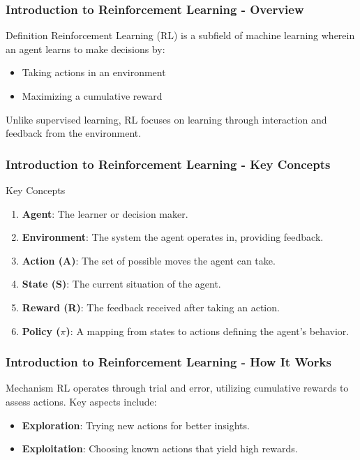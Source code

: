 \documentclass[aspectratio=169]{beamer}
\begin{document}
\frame{\titlepage}

\begin{frame}[fragile]
    \frametitle{Introduction to Reinforcement Learning - Overview}
    \begin{block}{Definition}
        Reinforcement Learning (RL) is a subfield of machine learning wherein an agent learns to make decisions by:
        \begin{itemize}
            \item Taking actions in an environment
            \item Maximizing a cumulative reward
        \end{itemize}
        Unlike supervised learning, RL focuses on learning through interaction and feedback from the environment.
    \end{block}
\end{frame}

\begin{frame}[fragile]
    \frametitle{Introduction to Reinforcement Learning - Key Concepts}
    \begin{block}{Key Concepts}
        \begin{enumerate}
            \item \textbf{Agent}: The learner or decision maker.
            \item \textbf{Environment}: The system the agent operates in, providing feedback.
            \item \textbf{Action (A)}: The set of possible moves the agent can take.
            \item \textbf{State (S)}: The current situation of the agent.
            \item \textbf{Reward (R)}: The feedback received after taking an action.
            \item \textbf{Policy (\(\pi\))}: A mapping from states to actions defining the agent's behavior.
        \end{enumerate}
    \end{block}
\end{frame}

\begin{frame}[fragile]
    \frametitle{Introduction to Reinforcement Learning - How It Works}
    \begin{block}{Mechanism}
        RL operates through trial and error, utilizing cumulative rewards to assess actions. Key aspects include:
        \begin{itemize}
            \item \textbf{Exploration}: Trying new actions for better insights.
            \item \textbf{Exploitation}: Choosing known actions that yield high rewards.
        \end{itemize}
    \end{block}
\end{frame}
\end{document}
